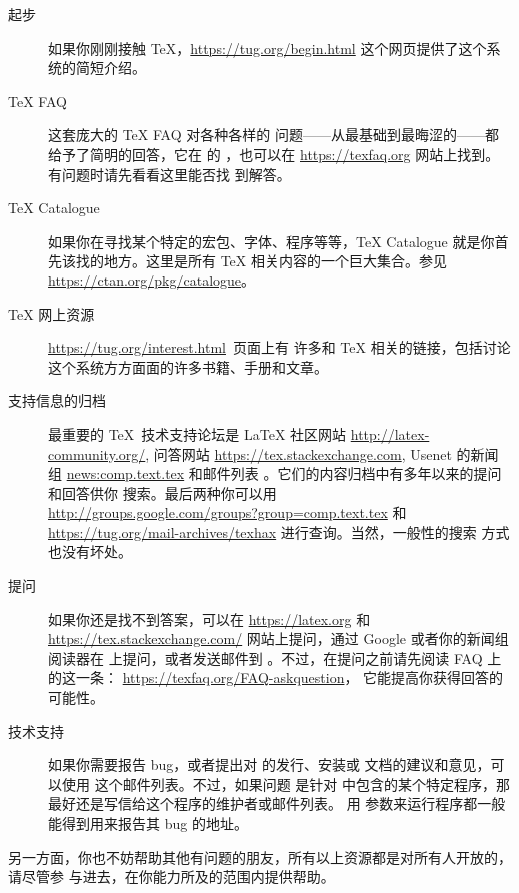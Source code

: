 \documentclass{article}
\begin{document}
\begin{description}
\item [起步] 如果你刚刚接触 \TeX，\url{https://tug.org/begin.html}
这个网页提供了这个系统的简短介绍。

\item [\TeX{} FAQ] 这套庞大的 \TeX{} FAQ 对各种各样的
问题——从最基础到最晦涩的——都给予了简明的回答，它在 \TL{} 的
，也可以在
\url{https://texfaq.org} 网站上找到。有问题时请先看看这里能否找
到解答。

\item [\TeX{} Catalogue] 如果你在寻找某个特定的宏包、字体、程序等等，\TeX{}
Catalogue 就是你首先该找的地方。这里是所有 \TeX{} 相关内容的一个巨大集合。参见
\url{https://ctan.org/pkg/catalogue}。

\item [\TeX{} 网上资源] \url{https://tug.org/interest.html}~页面上有
许多和 \TeX{} 相关的链接，包括讨论这个系统方方面面的许多书籍、手册和文章。

\item [支持信息的归档] 最重要的 \TeX\ 技术支持论坛是
\LaTeX{} 社区网站 \url{http://latex-community.org/}, 问答网站
\url{https://tex.stackexchange.com}, Usenet 的新闻组 \url{news:comp.text.tex}
和邮件列表 。它们的内容归档中有多年以来的提问和回答供你
搜索。最后两种你可以用 \\
\url{http://groups.google.com/groups?group=comp.text.tex} 和 \\
\url{https://tug.org/mail-archives/texhax} 进行查询。当然，一般性的搜索
方式也没有坏处。

\item [提问] 如果你还是找不到答案，可以在 \url{https://latex.org} 和
\url{https://tex.stackexchange.com/} 网站上提问，通过 Google
或者你的新闻组阅读器在  上提问，或者发送邮件到
。不过，在提问之前请先阅读 FAQ 上的这一条：
\url{https://texfaq.org/FAQ-askquestion}，
它能提高你获得回答的可能性。

\item [\TL{} 技术支持] 如果你需要报告 bug，或者提出对 \TL{} 的发行、安装或
文档的建议和意见，可以使用  这个邮件列表。不过，如果问题
是针对 \TL{} 中包含的某个特定程序，那最好还是写信给这个程序的维护者或邮件列表。
用  参数来运行程序都一般能得到用来报告其 bug 的地址。

\end{description}

另一方面，你也不妨帮助其他有问题的朋友，所有以上资源都是对所有人开放的，请尽管参
与进去，在你能力所及的范围内提供帮助。
\end{document}
